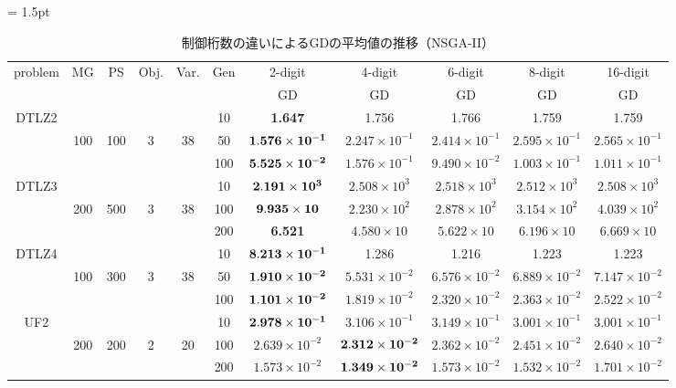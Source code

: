 \documentclass[../main/main]{subfiles}
\begin{document}
\begin{table}[htbp]
\fontsize{7.5pt}{7.5pt} \selectfont
\tabcolsep = 1.5pt
\centering
\caption{制御桁数の違いによるGDの平均値の推移（NSGA-II）}
\label{tbl:gd_nsgaii}
\begin{tabular}{c|ccccc|c|c|c|c|c}
\hline 
problem & MG & PS & Obj. & Var. & Gen & 2-digit & 4-digit & 6-digit & 8-digit & 16-digit \\ 
\cline{7-11}
&&&&&&GD&GD&GD&GD&GD\\
\hline
\multirow{3}{*}{DTLZ2} &        &  & &     & 10 & \bf{1.647} &   1.756 &  1.766 &  1.759 & 1.759\\
  				   & 100 & 100 & 3 & 38 & 50 &$\bf{1.576 \times 10^{-1}}$ &  $2.247 \times 10^{-1}$ & $2.414 \times 10^{-1}$ & $2.595 \times 10^{-1}$ & $2.565 \times 10^{-1}$\\
				   &        &     &           &   &100 & $\bf{5.525 \times 10^{-2}}$ & $1.576 \times 10^{-1}$ & $9.490 \times 10^{-2}$ & $1.003 \times 10^{-1}$ & $1.011 \times 10^{-1}$\\
\hline
\multirow{3}{*}{DTLZ3} &     &&   &       & 10 & $\bf{2.191 \times 10^{3}}$ & $2.508 \times 10^{3}$ &  $2.518 \times 10^{3}$ & $2.512 \times 10^{3}$ & $2.508 \times 10^{3}$\\
  				   & 200 & 500 & 3 & 38 &100 & $\bf{9.935 \times 10}$ & $2.230 \times 10^{2}$ &  $2.878 \times 10^{2}$ & $3.154 \times 10^{2}$ & $4.039 \times 10^{2}$\\
				   &        &   &&     &200 & \bf{6.521} & $4.580 \times 10$ &  $5.622 \times 10$ & $6.196 \times 10$ & $6.669 \times 10$\\

\hline
\multirow{3}{*}{DTLZ4} &        &     &&  & 10 & $\bf{8.213 \times 10^{-1}}$ & 1.286 & 1.216 & 1.223 & 1.223\\
  				   & 100 & 300 & 3&38& 50 & $\bf{1.910 \times 10^{-2}}$ & $5.531 \times 10^{-2}$ & $6.576 \times 10^{-2}$ & $6.889 \times 10^{-2}$ & $7.147 \times 10^{-2}$\\
				   &        &     &&   &100 & $\bf{1.101 \times 10^{-2}}$ & $1.819 \times 10^{-2}$ & $2.320 \times 10^{-2}$ & $2.363 \times 10^{-2}$ & $2.522 \times 10^{-2}$\\
\hline
\multirow{3}{*}{UF2} &        &    &&   & 10 &$\bf{2.978 \times 10^{-1}}$ & $3.106 \times 10^{-1}$ & $3.149 \times 10^{-1}$ & $3.001 \times 10^{-1}$ & $3.001 \times 10^{-1}$\\
  				   & 200 & 200 & 2 & 20 & 100 &$2.639 \times 10^{-2}$ & $\bf{2.312 \times 10^{-2}}$ & $2.362 \times 10^{-2}$ & $2.451 \times 10^{-2}$ & $2.640 \times 10^{-2}$\\
				   &        &      &&  &200 & $1.573 \times 10^{-2}$ & $\bf{1.349 \times 10^{-2}}$ & $1.573 \times 10^{-2}$ & $1.532 \times 10^{-2}$ & $1.701 \times 10^{-2}$\\


\end{tabular}
\end{table}
\end{document}
